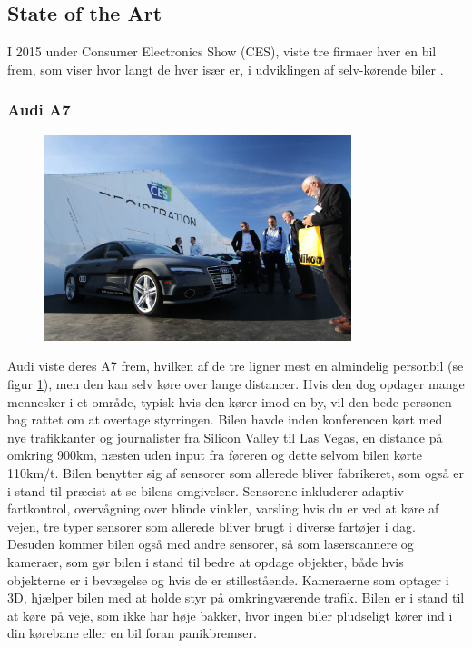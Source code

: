 \subsection{State of the Art} 
I 2015 under Consumer Electronics Show (CES), viste tre firmaer hver en bil frem, som viser hvor langt de hver især er, i udviklingen af selv-kørende biler \cite{CES}.

\subsubsection{Audi A7}
\begin{figure}[h!]
	\centering
	\includegraphics[width=0.8\textwidth]{images/150106_0345_ces.jpg}
	\label{fig:Audi_A7}
\end{figure}
Audi viste deres A7 frem, hvilken af de tre ligner mest en almindelig personbil (se figur \ref{fig:Audi_A7}), men den kan selv køre over lange distancer. Hvis den dog opdager mange mennesker i et område, typisk hvis den kører imod en by, vil den bede personen bag rattet om at overtage styrringen. Bilen havde inden konferencen kørt med nye trafikkanter og journalister fra Silicon Valley til Las Vegas, en distance på omkring 900km, næsten uden input fra føreren og dette selvom bilen kørte 110km/t. Bilen benytter sig af sensorer som allerede bliver fabrikeret, som også er i stand til præcist at se bilens omgivelser. Sensorene inkluderer adaptiv fartkontrol, overvågning over blinde vinkler, varsling hvis du er ved at køre af vejen, tre typer sensorer som allerede bliver brugt i diverse fartøjer i dag. Desuden kommer bilen også med andre sensorer, så som laserscannere og kameraer, som gør bilen i stand til bedre at opdage objekter, både hvis objekterne er i bevægelse og hvis de er stillestående. Kameraerne som optager i 3D, hjælper bilen med at holde styr på omkringværende trafik. Bilen er i stand til at køre på veje, som ikke har høje bakker, hvor ingen biler pludseligt kører ind i din kørebane eller en bil foran panikbremser.


